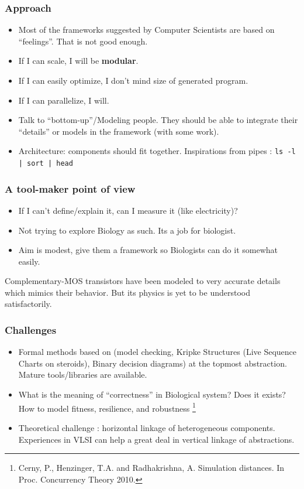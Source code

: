 \documentclass{beamer}
\begin{document}
\begin{frame}
  \frametitle{Approach}
  \begin{itemize}

    \item Most of the frameworks suggested by Computer Scientists are based on
      “feelings”. That is not good enough.
    \item If I can scale, I will be \textbf{modular}.
    \item If I can easily optimize, I don't mind size of generated program.
    \item If I can parallelize, I will. 
    \item Talk to “bottom-up”/Modeling people. They should be able to integrate
      their “details” or models in the framework (with some work).
    \item Architecture: components should fit together. Inspirations from pipes : \texttt{ls -l | sort | head } 
  \end{itemize}
\end{frame}

\begin{frame}
\frametitle{A tool-maker point of view}
\begin{itemize}
  \item If I can't define/explain it, can I measure it (like electricity)?
  \item Not trying to explore Biology as such. Its a job for biologist.
  \item Aim is modest, give them a framework so Biologists can do it somewhat easily.
\end{itemize}

\begin{alertblock}{}
Complementary-MOS transistors have been modeled to very accurate details which
mimics their behavior. But its physics is yet to be understood satisfactorily.
\end{alertblock}
\end{frame}

\begin{frame}
  \frametitle{Challenges}
  \begin{itemize}
    

    \item Formal methods based on (model checking, Kripke Structures (Live
      Sequence Charts on steroids), Binary decision diagrams) at the topmost
      abstraction. Mature tools/libraries are available. 
    
    \item What is the meaning of “correctness” in Biological system? Does it
      exists?  How to model fitness, resilience, and robustness \footnote{
        Cerny, P., Henzinger, T.A. and Radhakrishna, A. Simulation distances. In
      Proc. Concurrency Theory 2010.}

    \item Theoretical challenge : horizontal linkage of heterogeneous
      components.  Experiences in VLSI can help a great deal in vertical linkage
      of abstractions. 
      

\end{itemize}
\end{frame}
\end{document}
